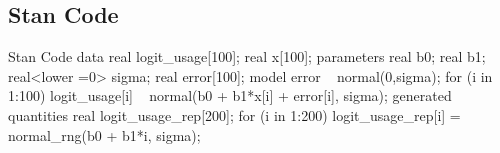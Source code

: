 \documentclass{article}
\begin{document}
\subsection{Stan Code}
\begin{sexylisting}{Stan Code}
data{
  real logit_usage[100];
  real x[100];
}
parameters{
  real b0;
  real b1;
  real<lower =0> sigma;
  real error[100];
}
model{
  error ~ normal(0,sigma);
  for (i in 1:100)
  logit_usage[i] ~ normal(b0 + b1*x[i] + error[i], sigma);
}
generated quantities{
  real logit_usage_rep[200];
  for (i in 1:200){
    logit_usage_rep[i] = normal_rng(b0 + b1*i, sigma);
  }
}
\end{sexylisting}

















  
\end{document}
